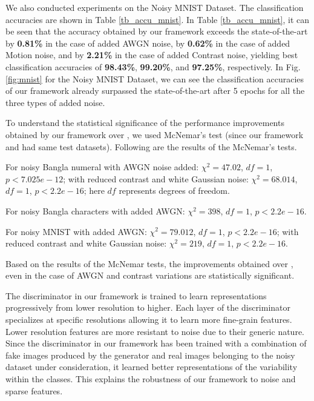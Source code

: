 \documentclass[runningheads]{llncs}
\begin{document}
We also conducted experiments on the Noisy MNIST Dataset.  The classification accuracies  are shown in Table \ref{tb_accu_mnist}. In  Table \ref{tb_accu_mnist}, it can be seen that the accuracy obtained by our framework exceeds the state-of-the-art by \textbf{0.81\%} in the case of added AWGN noise, by \textbf{0.62\%} in the case of added  Motion noise, and by \textbf{2.21\%} in the case of added  Contrast noise, yielding best classification accuracies of \textbf{98.43\%}, \textbf{99.20\%}, and \textbf{97.25\%}, respectively. In Fig.\ref{fig:mnist} for  the Noisy MNIST Dataset, we can see the classification accuracies of our framework already  surpassed the state-of-the-art  after 5 epochs for all the three types of added noise. 

To understand the statistical significance of the performance improvements obtained by our framework over \cite{Karki18}, we used McNemar’s test   (since our framework and \cite{Karki18} had same test datasets).  Following are the results of the McNemar’s tests. 

For noisy Bangla numeral with AWGN noise added: $\chi^2  = 47.02$, $df = 1$, $p<7.025e-12$; with reduced contrast and white Gaussian noise: $\chi^2 = 68.014$, $df = 1$, $p<2.2e-16$; here $df$ represents degrees of freedom.  


For noisy Bangla characters with added AWGN: $\chi^2  = 398$, $df = 1$, $p<2.2e-16$.


 For noisy MNIST with added AWGN: $\chi^2  = 79.012$, $df = 1$, $p<2.2e-16$; with reduced contrast and white Gaussian noise: $\chi^2  = 219$, $df = 1$, $p<2.2e-16$. 

 
Based on the results of the McNemar tests, the improvements obtained over \cite{Karki18}, even in the case of AWGN and contrast variations are statistically significant. 



 The discriminator in our framework is trained  to learn representations  progressively from lower resolution to higher. Each layer of the discriminator
specializes at specific resolutions allowing it to learn more
fine-grain features. Lower resolution features are more resistant to noise due to their generic nature. 
Since the discriminator in our framework  has been trained with a combination of fake images produced by the generator and real images belonging to the  noisy dataset under consideration, it learned better representations of the variability within the classes.   This explains the robustness of our framework to noise and sparse features. 
\end{document}
